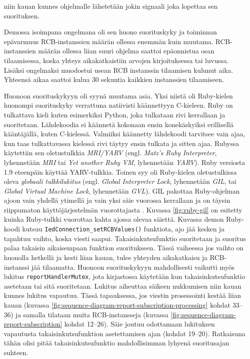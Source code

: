 niin kauan kunnes ohjelmalle lähetetään jokin signaali joka lopettaa sen suorituksen. \mbox{\cite{Kozlovski2017, Storimer2013, libIEC61850-repo}}

Demossa isoimpana ongelmana oli sen huono suorituskyky ja toiminnan epävarmuus RCB-instanssien määrän ollessa enemmän kuin muutama. RCB-instanssien määrän ollessa liian suuri ohjelma saattoi epäonnistua osan tilaamisessa, koska yhteys aikakatkaistiin arvojen kirjoituksessa tai luvussa. Lisäksi ongelmaksi muodostui usean RCB instanssin tilaamisen kulunut aika. Yhteensä aikaa saattoi kulua 30 sekuntia kaikkien instanssien tilaamiseen.

Huonoon suorituskykyyn oli syynä muutama asia. Yksi niistä oli Ruby-kielen huonompi suorituskyky verrattuna natiivisti käännettyyn C-kieleen. Ruby on tulkattava kieli kuten esimerkiksi Python, joka tulkataan rivi kerrallaan ja suoritetaan. Lähdekoodia ei käännetä kokonaan ensin konekäskyiksi erillisellä kääntäjällä, kuten C-kielessä. Valmiiksi käännetty lähdekoodi tarvitsee vain ajaa, kun taas tulkattavassa kielessä rivi täytyy ensin tulkata ja sitten ajaa. Rubyssa käytettiin sen oletustulkkia \emph{MRI/YARV} (engl. \emph{Matz's Ruby Interpreter}, lyhennetään \emph{MRI} tai \emph{Yet another Ruby VM}, lyhennetään \emph{YARV}). Ruby versiosta 1.9 eteenpäin käyttää YARV-tulkkia. Toinen syy oli Ruby-kielen oletustulkissa oleva \emph{globaali tulkkilukitus} (engl. \emph{Global Interpreter Lock}, lyhennetään \emph{GIL}, tai \emph{Global Virtual Machine Lock}, lyhennetään \emph{GVL}). GIL pakottaa Ruby-ohjelman ajoon vain yhdellä ytimellä ja vain yksi säie vuorossa kerrallaan ja on täysin riippumaton käyttöjärjestelmän vuorottajasta \mbox{\cite[s.~131--133]{Odaira2014}}. Kuvassa \ref{fig:ruby-gil} on esitetty kuinka Ruby-tulkki vuorottaa kahta ajossa olevaa säiettä. Kuvassa demon Ruby-koodi kutsuu \texttt{Ied\-Con\-nec\-ti\-on\-\_\-set\-RCB\-Va\-lu\-es\-()} funktiota, ajo jää kesken ja tapahtuu vaihto, koska viesti saapui. Takaisinkutsufunktio suoritetaan ja suoritus palaa takaisin aikaisempaan funktion suoritukseen. Tässä vaiheessa jos vaihto on huonolla hetkellä ja kesti liian kauan, tulee yhteyden aikakatkaisu ja RCB-instanssi jää tilaamatta. Huonoon suorituskykyyn mahdollisesti vaikutti myös lukitus \texttt{re\-port\-Hand\-ler\-Mu\-tex}, jota kirjastossa käytetään kun takaisinkutsufunktio asetetaan tai sitä suoritetaan. Lukitus aiheuttaa säikeen nukkumisen niin kauan kunnes lukitus vapautuu. Tässä tapauksessa, jos viestin prosessointi kestää liian kauan (kuvassa \ref{fig:sequence-diagram-report-subscription-processing} kohdat 33--36) ja samalla tilataan muita RCB-instansseja (kuvassa \ref{fig:sequence-diagram-report-subscription} kohdat 12--26). Säie joutuu odottamaan lukituksen vapautusta takaisinkutsufunktion asetettamisen ajan (kohdat 19--20). Ratkaisuna tähän olisi pitää takaisinkutsufunktio mahdollisimman lyhyenä suoritusajan suhteen.

